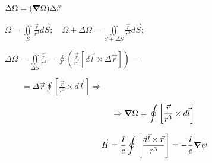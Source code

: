 \hfill
\begin{minipage}[c]{0.55\textwidth} %
    \( \Delta\Omega =(\grad\Omega)\Delta \vec{r} \) 

    \( \Omega= \underset{S}{\iint}\frac{\vec{r}}{r^3}d\vec{S};\quad \Omega+\Delta\Omega =\underset{S+\Delta S}{\iint} \frac{\vec{r}}{r^3}d\vec{S};  \)
    
    \( \Delta\Omega= \underset{\Delta S}{\iint} \frac{\vec{r}}{r^3}= \oint \left( \frac{\vec{r}}{r^3}[d\vec{l}\times \Delta\vec{r}]  \right)=  \)

    \(\qquad = \Delta\vec{r} \oint \left[ \frac{\vec{r}}{r^3}\times d\vec{l}  \right] \Rightarrow   \) 
\end{minipage}

\[
\Rightarrow \grad\Omega=\oint \left[ \frac{\vec{r}}{r^3}\times d\vec{l}  \right]
\]

\[
\vec{H}=\frac{I}{c}\oint \left[ \frac{d\vec{l} \times \vec{r}}{r^3}  \right] = -\frac{I}{c} \grad \psi
\]